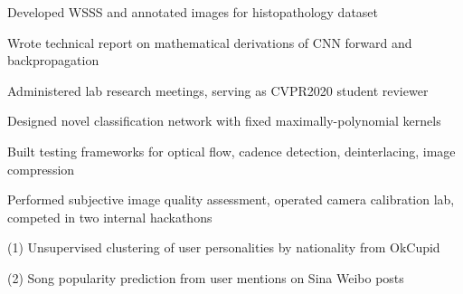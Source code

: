\documentclass[11pt]{cv_style}
\begin{document}
\begin{ditem}
	\item Developed WSSS and annotated images for histopathology dataset
	\item Wrote technical report on mathematical derivations of CNN forward and backpropagation
	\item Administered lab research meetings, serving as CVPR2020 student reviewer
\end{ditem}

%
\begin{ditem}
	\item Designed novel classification network with fixed maximally-polynomial kernels
\end{ditem}
%
\begin{ditem}
	\item Built testing frameworks for optical flow, cadence detection, deinterlacing, image compression
	\item Performed subjective image quality assessment, operated camera calibration lab, competed in two internal hackathons
\end{ditem}
%
\begin{ditem}
	\item (1) Unsupervised clustering of user personalities by nationality from OkCupid
	\item (2) Song popularity prediction from user mentions on Sina Weibo posts
\end{ditem}
%
\end{document}
